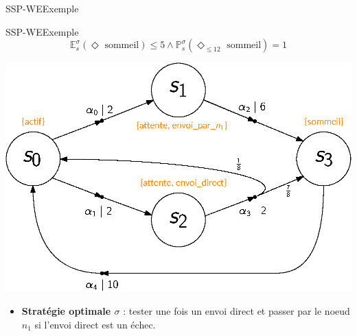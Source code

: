 \documentclass[compress]{beamer}
\theoremstyle{theorem}%
\begin{document}
\begin{frame}{SSP-WE}{Exemple}
\end{frame}

\begin{frame}{SSP-WE}{Exemple}
    \vspace{-0.05\linewidth}
    \[ \mathbb{E}^{\sigma}_s(\Diamond \text{ sommeil}) \leq 5 \wedge \mathbb{P}^\sigma_s(\Diamond_{\leq 12} \text{ sommeil}) = 1 \]
    \begin{center}
      \includegraphics[width=0.6\linewidth]{resources/main-mdp3}
    \end{center}
    \vspace{-0.05\linewidth}
    \begin{itemize}
      \item \textbf{\color{fibeamer@orange}Stratégie optimale $\sigma$} : tester une fois un envoi direct et passer par le noeud $n_1$ si l'envoi direct est un échec.
    \end{itemize}
\end{frame}
\end{document}
